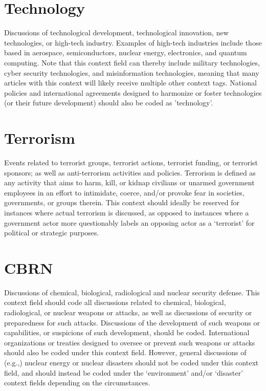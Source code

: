 \documentclass[11pt]{report}
\begin{document}
\section{Technology}\label{context:tech}
Discussions of technological development, technological innovation, new technologies, or high-tech industry. Examples of high-tech industries include those based in aerospace, semiconductors, nuclear energy, electronics, and quantum computing. Note that this context field can thereby include military technologies, cyber security technologies, and misinformation technologies, meaning that many articles with this context will likely receive multiple other context tags. National policies and international agreements designed to harmonize or foster technologies (or their future development) should also be coded as 'technology'.



\section{Terrorism}\label{context:terrorism}

Events related to terrorist groups, terrorist actions, terrorist funding, or terrorist sponsors; as well as anti-terrorism activities and policies. Terrorism is defined as any activity that aims to harm, kill, or kidnap civilians or unarmed government employees in an effort to intimidate, coerce, and/or provoke fear in societies, governments, or groups therein. This context should ideally be reserved for instances where actual terrorism is discussed, as opposed to instances where a government actor more questionably labels an opposing actor as a `terrorist' for political or strategic purposes.

\section{CBRN}\label{context:cbrn}

Discussions of chemical, biological, radiological and nuclear security defense. This context field should code all discussions related to chemical, biological, radiological, or nuclear weapons or attacks, as well as discussions of security or preparedness for such attacks. Discussions of the development of such weapons or capabilities, or suspicions of such development, should be coded. International organizations or treaties designed to oversee or prevent such weapons or attacks should also be coded under this context field. However, general discussions of (e.g.,) nuclear energy or nuclear disasters should not be coded under this context field, and should instead be coded under the `environment' and/or `disaster' context fields depending on the circumstances.
\end{document}
